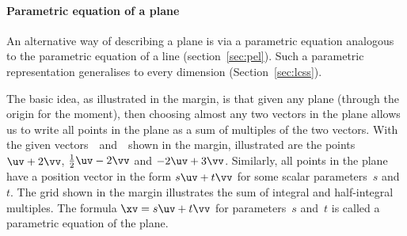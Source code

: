 



\paragraph{Parametric equation of a plane}
An alternative way of describing a plane is via a parametric equation analogous to the parametric equation of a line (section~\ref{sec:pel}).
Such a parametric representation generalises to every dimension (Section~\ref{sec:lcss}).

The basic idea, as illustrated in the margin, is that given any plane (through the origin for the moment), then choosing almost any two vectors in the plane allows us to write all points in the plane as a sum of multiples of the two vectors.
With the given vectors~\uv\ and~\vv\ shown in the margin, illustrated are the points \(\uv+2\vv\), \(\tfrac12\uv-2\vv\) and \(-2\uv+3\vv\).
%
Similarly, all points in the plane have a position vector in the form \(s\uv+t\vv\) for some scalar parameters~\(s\) and~\(t\).
The grid shown in the margin illustrates the sum of integral and half-integral multiples.
The formula \(\xv=s\uv+t\vv\) for parameters~\(s\) and~\(t\) is called a parametric equation of the plane.




